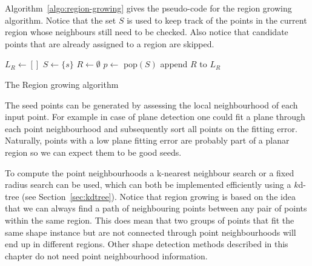 Algorithm~\ref{algo:region-growing} gives the pseudo-code for the region growing algorithm.
Notice that the set $S$ is used to keep track of the points in the current region whose neighbours still need to be checked.
Also notice that candidate points that are already assigned to a region are skipped.
\begin{algorithm}
	
	$L_R \leftarrow [\xspace]$\;
	 {
		$S \leftarrow \{s\}$\;
		$R \leftarrow \emptyset$\;
		{
			$p \leftarrow $ pop$(S)$\;
			{
				 {
				}
			}
		}
		append $R$ to $L_R$\;
	}
	\caption{The Region growing algorithm}%
\label{algo:region-growing}
\end{algorithm}

The seed points can be generated by assessing the local neighbourhood of each input point. 
For example in case of plane detection one could fit a plane through each point neighbourhood and subsequently sort all points on the fitting error. 
Naturally, points with a low plane fitting error are probably part of a planar region so we can expect them to be good seeds.

To compute the point neighbourhoods a k-nearest neighbour search or a fixed radius search can be used, which can both be implemented efficiently using a $k$d-tree (see Section~\ref{sec:kdtree}).
Notice that region growing is based on the idea that we can always find a path of neighbouring points between any pair of points within the same region.
This does mean that two groups of points that fit the same shape instance but are not connected through point neighbourhoods will end up in different regions.
Other shape detection methods described in this chapter do not need point neighbourhood information.

